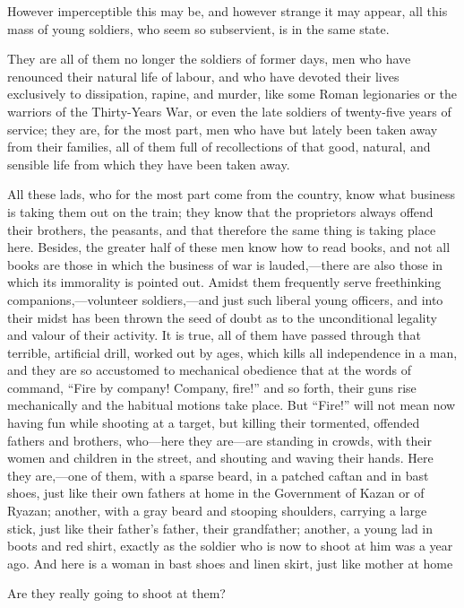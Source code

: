 \documentclass{book}
\begin{document}
However imperceptible this may be, and however strange it may appear, all this mass of young soldiers, who seem so subservient, is in the same state.

They are all of them no longer the soldiers of former days, men who have renounced their natural life of labour, and who have devoted their lives exclusively to dissipation, rapine, and murder, like some Roman legionaries or the warriors of the Thirty-Years War, or even the late soldiers of twenty-five years of service; they are, for the most part, men who have but lately been taken away from their families, all of them full of recollections of that good, natural, and sensible life from which they have been taken away.

All these lads, who for the most part come from the country, know what business is taking them out on the train; they know that the proprietors always offend their brothers, the peasants, and that therefore the same thing is taking place here. Besides, the greater half of these men know how to read books, and not all books are those in which the business of war is lauded,—there are also those in which its immorality is pointed out. Amidst them frequently serve freethinking companions,—volunteer soldiers,—and just such liberal young officers, and into their midst has been thrown the seed of doubt as to the unconditional legality and valour of their activity. It is true, all of them have passed through that terrible, artificial drill, worked out by ages, which kills all independence in a man, and they are so accustomed to mechanical obedience that at the words of command, “Fire by company! Company, fire!” and so forth, their guns rise mechanically and the habitual motions take place. But “Fire!” will not mean now having fun while shooting at a target, but killing their tormented, offended fathers and brothers, who—here they are—are standing in crowds, with their women and children in the street, and shouting and waving their hands. Here they are,—one of them, with a sparse beard, in a patched caftan and in bast shoes, just like their own fathers at home in the Government of Kazan or of Ryazan; another, with a gray beard and stooping shoulders, carrying a large stick, just like their father’s father, their grandfather; another, a young lad in boots and red shirt, exactly as the soldier who is now to shoot at him was a year ago. And here is a woman in bast shoes and linen skirt, just like mother at home

Are they really going to shoot at them?
\end{document}
